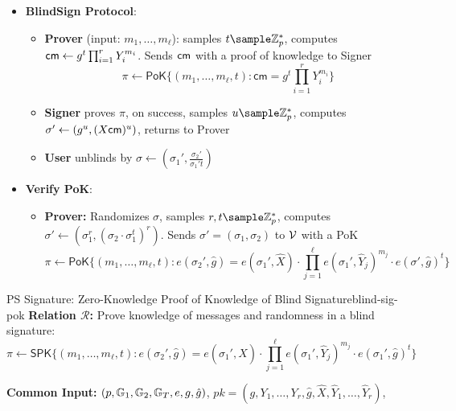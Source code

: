{\begin{itemize}
    \item \textbf{BlindSign Protocol}:
        \begin{itemize}
            \item \textbf{Prover} (input: $m_1,\ldots,m_\ell$): samples $t \sample \Z_p^*$, computes $\mathsf{cm} \gets g^t\prod_{i=1}^r Y_i^{m_i}$. Sends $\mathsf{cm}$ with a proof of knowledge to Signer
                \[
               \pi \leftarrow \mathsf{PoK}\{(m_1,\ldots,m_\ell,t): \mathsf{cm} = g^t\prod_{i=1}^r  Y_i^{m_i}\}
                \]
                
            \item \textbf{Signer} proves $\pi$, on success, samples $u \sample \Z_p^*$, computes $\sigma' \gets (g^u, (X\mathsf{cm})^u)$, returns to Prover
            
            \item \textbf{User} unblinds by $\sigma \gets (\sigma_1', \frac{\sigma_2'}{\sigma_1{'t}})$
        \end{itemize}

        \item \textbf{Verify PoK}:
        \begin{itemize}
            \item \textbf{Prover:} Randomizes $\sigma$, samples $r,t \sample \Z_p^*$, computes $\sigma' \gets (\sigma_1^r, (\sigma_2 \cdot \sigma_1^t)^r)$. Sends $\sigma' = (\sigma_1, \sigma_2)$ to $\mathcal{V}$ with a PoK
                \[
               \pi \gets \mathsf{PoK}\{(m_1,\ldots,m_\ell,t): e(\sigma_2', \hat{g}) = e(\sigma_1',\hat{X}) \cdot \prod_{j=1}^\ell e(\sigma_1', \widehat{Y}_j)^{m_j} \cdot e(\sigma', \hat{g})^t\}
                \]
                
        \end{itemize}
\end{itemize}


\begin{protocol}{PS Signature: Zero-Knowledge Proof of Knowledge of Blind Signature}{blind-sig-pok}
    \textbf{Relation $\mathcal{R}$:} Prove knowledge of messages and randomness in a blind signature:
        \[
        \pi \gets \mathsf{SPK}\{(m_1,\ldots,m_\ell,t): e(\sigma_2', \hat{g}) = e(\sigma_1',\hat{X}) \cdot \prod_{j=1}^\ell e(\sigma_1', \widehat{Y}_j)^{m_j} \cdot e(\sigma_1', \hat{g})^t\}
        \]
    
    \textbf{Common Input:} $(p, \mathbb{G}_1, \mathbb{G}_2, \mathbb{G}_T, e, g, \hat{g})$, $pk = (g, Y_1,\ldots,Y_r, \hat{g}, \hat{X}, \widehat{Y}_1,\ldots,\widehat{Y}_r)$, 
    

\end{protocol}}
